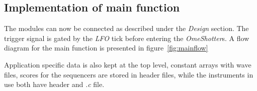 \subsection{Implementation of main function}

The modules can now be connected as described under the \emph{Design} section.
The trigger signal is gated by the \emph{LFO} tick before entering the
\emph{OmeShotter}s. A flow diagram for the main function is presented in
figure~\ref{fig:mainflow}


Application specific data is also kept at the top level, constant arrays with
wave files, scores for the sequencers are stored in header files, while the
instruments in use both have header and \emph{.c} file.
